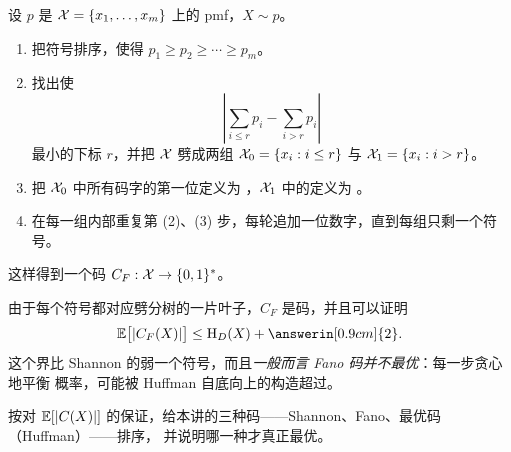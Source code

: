 \begin{definition}\label{def:fano-code}
设 $p$ 是 $\mathcal{X}=\{x_1,\ldots,x_m\}$ 上的 pmf，$X\sim p$。
\begin{enumerate}
  \item 把符号排序，使得 $p_1\ge p_2\ge\cdots\ge p_m$。
  \item 找出使
  \[
    \left|\sum_{i\le r}p_i-\sum_{i>r}p_i\right|
  \]
  最小的下标 $r$，并把 $\mathcal{X}$ 劈成两组
  $\mathcal{X}_0=\{x_i:i\le r\}$ 与 $\mathcal{X}_1=\{x_i:i>r\}$。
  \item 把 $\mathcal{X}_0$ 中所有码字的第一位定义为 ，$\mathcal{X}_1$ 中的定义为
  。
  \item 在每一组内部重复第 (2)、(3) 步，每轮追加一位数字，直到每组只剩一个符号。
\end{enumerate}
这样得到一个码 $C_F:\mathcal{X}\to\{0,1\}^*$。
\end{definition}

由于每个符号都对应劈分树的一片叶子，$C_F$ 是码，并且可以证明
\[
  \E\bigl[|C_F(X)|\bigr]\le\Ent_D(X)+\answerin[0.9cm]{2}.
\]
这个界比 Shannon 的弱一个符号，而且\emph{一般而言 Fano 码并不最优}：每一步贪心地平衡
概率，可能被 Huffman 自底向上的构造超过。

\begin{yourturn}
按对 $\mathbb{E}[|C(X)|]$ 的保证，给本讲的三种码——Shannon、Fano、最优码（Huffman）——排序，
并说明哪一种才真正最优。
\ifshowanswers\else\workspace[3]\fi
{}
\end{yourturn}

\vspace{0.8cm}
